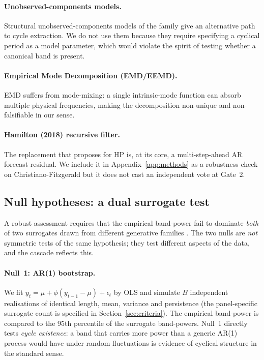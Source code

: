 \paragraph{Unobserved-components models.}
Structural unobserved-components models of the
\citet{harvey_trimbur2003} family give an alternative path to
cycle extraction. We do not use them because they require
specifying a cyclical period as a model parameter, which would
violate the spirit of testing whether a canonical band is
present.

\paragraph{Empirical Mode Decomposition (EMD/EEMD).}
EMD suffers from mode-mixing: a single intrinsic-mode function
can absorb multiple physical frequencies, making the decomposition
non-unique and non-falsifiable in our sense.

\paragraph{Hamilton (2018) recursive filter.}
The replacement that \citet{hamilton2018} proposes for HP is, at
its core, a multi-step-ahead AR forecast residual. We include it
in Appendix~\ref{app:methods} as a robustness check on
Christiano-Fitzgerald but it does not cast an independent vote at
Gate~2.

\subsection{Null hypotheses: a dual surrogate test}
\label{sec:dual_null}

A robust assessment requires that the empirical band-power fail to
dominate \emph{both} of two surrogates drawn from different
generative families
\citep{theiler_et_al1992,schreiber_schmitz2000}. The two nulls are
\emph{not} symmetric tests of the same hypothesis; they test
different aspects of the data, and the cascade reflects this.

\paragraph{Null~1: AR(1) bootstrap.}
We fit \(y_t = \mu + \phi(y_{t-1}-\mu) + \epsilon_t\) by OLS and
simulate \(B\) independent realisations of identical length, mean,
variance and persistence (the panel-specific surrogate count is
specified in Section~\ref{sec:criteria}). The empirical band-power is
compared to the 95th percentile of the surrogate band-powers.
Null~1 directly tests \emph{cycle existence}: a band that carries
more power than a generic AR(1) process would have under random
fluctuations is evidence of cyclical structure in the standard
sense.

